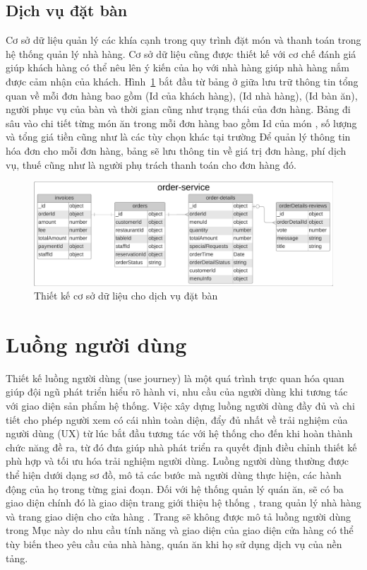 \subsection{Dịch vụ đặt bàn}
Cơ sở dữ liệu  quản lý các khía cạnh trong quy trình đặt món và thanh toán trong hệ thống quản lý nhà hàng.
Cơ sở dữ liệu cũng được thiết kế với cơ chế đánh giá giúp khách hàng có thể nêu lên ý kiến của họ với nhà hàng giúp nhà hàng nắm được cảm nhận của khách.
Hình~\ref{fig:order-service-database-design} bắt đầu từ bảng  ở giữa lưu trữ thông tin tổng quan về mỗi đơn hàng bao gồm  (Id của khách hàng),  (Id nhà hàng),  (Id bàn ăn), người phục vụ của bàn  và thời gian cũng như trạng thái của đơn hàng.
Bảng  đi sâu vào chi tiết từng món ăn trong mỗi đơn hàng bao gồm Id của món , số lượng và tổng giá tiền cũng như là các tùy chọn khác tại trường 
Để quản lý thông tin hóa đơn cho mỗi đơn hàng, bảng  sẽ lưu thông tin về giá trị đơn hàng, phí dịch vụ, thuế cũng như là người phụ trách thanh toán cho đơn hàng đó.
\begin{figure}[H]
	\centering
	\includegraphics[width=\textwidth]{images/hChip/MongoDB/order-service-design.png}
	\caption{Thiết kế cơ sở dữ liệu cho dịch vụ đặt bàn}
	\label{fig:order-service-database-design}
\end{figure}

\section{Luồng người dùng}\label{sec:user-journey}
Thiết kế luồng người dùng (use journey) là một quá trình trực quan hóa quan giúp đội ngũ phát triển hiểu rõ hành vi, nhu cầu của người dùng khi tương tác với giao diện sản phẩm hệ thống.
Việc xây dựng luồng người dùng đầy đủ và chi tiết cho phép người xem có cái nhìn toàn diện, đẩy đủ nhất về trải nghiệm của người dùng (UX) từ lúc bắt đầu tương tác với hệ thống cho đến khi hoàn thành chức năng đề ra, từ đó đưa giúp nhà phát triển ra quyết định điều chỉnh thiết kế phù hợp và tối ưu hóa trải nghiệm người dùng.
Luồng người dùng thường được thể hiện dưới dạng sơ đồ, mô tả các bước mà người dùng thực hiện, các hành động của họ trong từng giai đoạn.
Đối với hệ thống quản lý quán ăn, sẽ có ba giao diện chính đó là giao diện trang giới thiệu hệ thống , trang quản lý nhà hàng  và trang giao diện cho cửa hàng .
Trang  sẽ không được mô tả luồng người dùng trong Mục này do nhu cầu tính năng và giao diện của giao diện cửa hàng có thể tùy biến theo yêu cầu của nhà hàng, quán ăn khi họ sử dụng dịch vụ của nền tảng.
